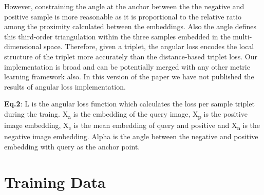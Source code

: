 \documentclass[10pt,twocolumn,letterpaper]{article}
\begin{document}
However, constraining the angle at the anchor between the the negative and positive sample is more reasonable as it is proportional to the relative ratio among the proximity calculated between the embeddings. Also the angle defines this third-order triangulation within the three samples embedded in the multi-dimensional space. Therefore, given a triplet, the angular loss encodes the local structure of the triplet more accurately than the distance-based triplet loss. Our implementation is broad and can be potentially merged with any other metric learning framework also.  In this version of the paper we have not published the results of angular loss implementation.

\textbf{Eq.2}:  L is the angular loss function which calculates the loss per sample triplet during the traing. X\textsubscript{a} is the embedding of the query image, X\textsubscript{p} is the positive image embedding, X\textsubscript{c} is the mean embedding of query and positive and X\textsubscript{n} is the negative image embedding. Alpha is the angle between the negative and positive embedding with query as the anchor point.\\

\vspace{-2mm}
\section{Training Data}\vspace{-1mm}
\end{document}
